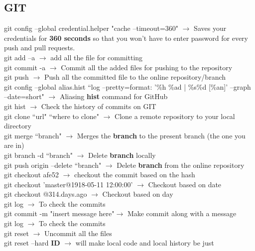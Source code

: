 \documentclass[twoside,a4paper]{article}
\newcommand{\tcb}{\color{blue}} \newcommand{\tcc}{\color{cyan}} \newcommand{\tcr}{\color{red}}
\newcommand{\tck}{\color{black}}
\newcommand{\ra }{$\rightarrow$ }
\newcommand{\hs}{\hspace}
\begin{document}
\begin{multicols}{2}
    \tcc \section{GIT}

    \hs{-0.8 cm} \tcr  git config --global credential.helper "cache --timeout=360" \tck \ra Saves
    your credentials for \textbf{360 seconds} so that you won't have to enter password for every
    push and pull requests.\\
    \tcr git add --a \tck \ra add all the file for committing\\
    \tcr git commit -a \tck \ra Commit all the added files for pushing to the repository \\
    \tcr git push \tck \ra Push all the committed file to the online repository/branch \\
    \tcr git \tcb config --global alias.hist ``log --pretty=format: '\%h \%ad | \%s\%d [\%an]'
    --graph --date=short" \tck \ra Aliasing \textbf{hist} command for GitHub\\
    \tcr git hist \tck \ra Check the history of commits on GIT\\
    \tcr git clone \tcb ``url" ``where to clone" \tck  \ra Clone a remote repository to your local
    directory\\
    \tcr git merge \tcb ``branch" \tck $\rightarrow$ Merges the \textbf{branch} to the present
    branch (the one you are in)\\
    \tcr git branch \tcb -d ``branch" \tck \ra Delete \textbf{branch} locally\\
    \tcr git push \tcb origin --delete ``branch" \tck \ra Delete \textbf{branch} from the online
    repository\\
    \tcr git checkout \tcb afe52 \tck \ra checkout the commit based on the hash\\
    \tcr git checkout \tcb 'master@{1918-05-11 12:00:00}' \tck \ra Checkout based on date\\
    \tcr git checkout \tcb @{314.days.ago} \tck \ra Checkout based on day\\
    \tcr git log \tck \ra To check the commits\\
    \tcr git commit \tcb -m "insert message here"\tck \ra Make commit along with a message\\
    \tcr git log \tck \ra To check the commits\\
    \tcr git reset \tck \ra Uncommit all the files\\
    \tcr git reset \tcb --hard \textbf{ID} \tck \ra will make local code and local history be just

\end{multicols}
\end{document}
